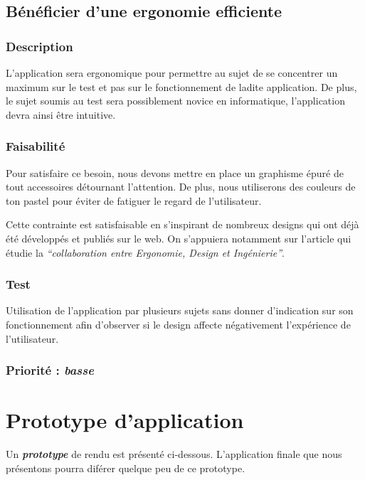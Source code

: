 \subsection{Bénéficier d’une ergonomie efficiente}

\subsubsection{Description}

L’application sera ergonomique pour permettre au sujet de se concentrer un maximum sur le test et pas sur le fonctionnement de ladite application. De plus, le sujet soumis au test sera possiblement novice en informatique, l’application devra ainsi être intuitive.

\subsubsection{Faisabilité}

Pour satisfaire ce besoin, nous devons mettre en place un graphisme épuré de tout accessoires détournant l’attention. De plus, nous utiliserons des couleurs de ton pastel pour éviter de fatiguer le regard de l’utilisateur.

Cette contrainte est satisfaisable en s’inspirant de nombreux designs qui ont déjà été développés et publiés sur le web. On s’appuiera notamment sur l’article \cite{lente2014scenariser} qui étudie la \textit{“collaboration entre Ergonomie, Design et Ingénierie”}.

\subsubsection{Test}

Utilisation de l’application par plusieurs sujets sans donner d’indication sur son fonctionnement afin d’observer si le design affecte négativement l'expérience de l’utilisateur.

\subsubsection{Priorité : \textit{basse}}

\section{Prototype d'application}

 Un \textbf{\textit{prototype}} de rendu est présenté ci-dessous. L'application finale que nous présentons pourra diférer quelque peu de ce prototype.

